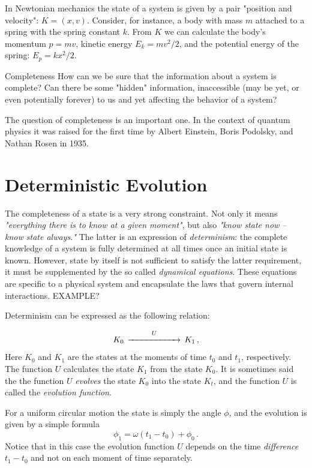 \begin{myExample}
	In Newtonian mechanics the state of a system is given by a pair "position and velocity": $K=(x, v)$. Consider, for instance, a body with mass $m$ attached to a spring with the spring constant $k$. From $K$ we can calculate the body's momentum $p=mv$, kinetic energy $E_k=mv^2/2$, and the potential energy of the spring: $E_p=kx^2/2$.
\end{myExample}

\begin{mybio}{Completeness}
	How can we be sure that the information about a system is complete? Can there be some "hidden" information, inaccessible (may be yet, or even potentially forever) to us and yet affecting the behavior of a system?
	
	The question of completeness is an important one. In the context of quantum physics it was raised for the first time by Albert Einstein, Boris Podolsky, and Nathan Rosen in 1935.
\end{mybio}

\section{Deterministic Evolution}
The completeness of a state is a very strong constraint. Not only it means \emph{"everything there is to know at a given moment"}, but also \emph{"know state now -- know state always."} The latter is an expression of \emph{determinism}: the complete knowledge of a system is fully determined at all times once an initial state is known. However, state by itself  is not sufficient to satisfy the latter requirement, it must be supplemented by the so called \emph{dynamical equations}. These equations are specific to a physical system and encapsulate the laws that govern internal interactions. EXAMPLE?

Determinism can be expressed as the following relation:

\[
K_0\, \overset{U}{\xrightarrow{\hspace*{2cm}}}\, K_1\,,
\]
Here $K_0$ and $K_1$ are the states at the moments of time $t_0$ and $t_1$, respectively. The function $U$ calculates the state $K_1$ from the state $K_0$. It is sometimes said the the function $U$ \emph{evolves} the state $K_0$ into the state $K_t$, and the function $U$ is called the \emph{evolution function}.

\begin{myExample}
	For a uniform circular motion the state is simply the angle $\phi$, and the evolution is given by a simple formula
	\[
	\phi_1 =\omega (t_1-t_0) + \phi_0\,.	
	\]
	Notice that in this case the evolution function $U$ depends on the time \emph{difference} $t_1-t_0$ and not on each moment of time separately.
\end{myExample}

